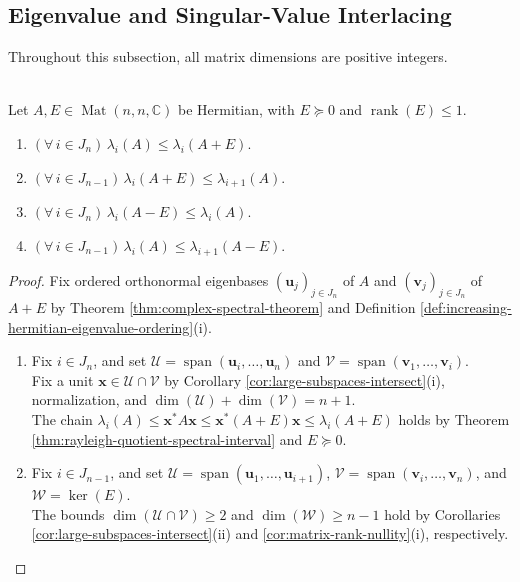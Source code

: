 \subsection{Eigenvalue and Singular-Value Interlacing}

Throughout this subsection, all matrix dimensions are positive integers.

\begin{theorem} \label{thm:rank-one-psd-eigenvalue-interlacing} \\
Let $A,E\in\operatorname{Mat}(n,n,\mathbb{C})$ be Hermitian, with $E\succeq0$ and $\operatorname{rank}(E)\leq1$.
\begin{enumerate}[label=(\roman*)]
\setlength{\itemsep}{0pt}
\item $(\forall\,i\in J_n)\,\lambda_i(A)\leq\lambda_i(A+E)$.
\item $(\forall\,i\in J_{n-1})\,\lambda_i(A+E)\leq\lambda_{i+1}(A)$.
\item $(\forall\,i\in J_n)\,\lambda_i(A-E)\leq\lambda_i(A)$.
\item $(\forall\,i\in J_{n-1})\,\lambda_i(A)\leq\lambda_{i+1}(A-E)$.
\end{enumerate}
\begin{proof}
Fix ordered orthonormal eigenbases $(\mathbf{u}_j)_{j\in J_n}$ of $A$ and $(\mathbf{v}_j)_{j\in J_n}$ of $A+E$ by Theorem \ref{thm:complex-spectral-theorem} and Definition \ref{def:increasing-hermitian-eigenvalue-ordering}(i).
\begin{enumerate}[label=(\roman*)]
\setlength{\itemsep}{0pt}
\item Fix $i\in J_n$, and set $\mathcal{U}=\operatorname{span}(\mathbf{u}_i,\ldots,\mathbf{u}_n)$ and $\mathcal{V}=\operatorname{span}(\mathbf{v}_1,\ldots,\mathbf{v}_i)$.\\
Fix a unit $\mathbf{x}\in\mathcal{U}\cap\mathcal{V}$ by Corollary \ref{cor:large-subspaces-intersect}(i), normalization, and $\dim(\mathcal{U})+\dim(\mathcal{V})=n+1$.\\
The chain $\lambda_i(A)\leq\mathbf{x}^*A\mathbf{x}\leq\mathbf{x}^*(A+E)\mathbf{x}\leq\lambda_i(A+E)$ holds by Theorem \ref{thm:rayleigh-quotient-spectral-interval} and $E\succeq0$.
\item Fix $i\in J_{n-1}$, and set $\mathcal{U}=\operatorname{span}(\mathbf{u}_1,\ldots,\mathbf{u}_{i+1})$, $\mathcal{V}=\operatorname{span}(\mathbf{v}_i,\ldots,\mathbf{v}_n)$, and $\mathcal{W}=\ker(E)$.\\
The bounds $\dim(\mathcal{U}\cap\mathcal{V})\geq2$ and $\dim(\mathcal{W})\geq n-1$ hold by Corollaries \ref{cor:large-subspaces-intersect}(ii) and \ref{cor:matrix-rank-nullity}(i), respectively.\\

\end{enumerate}
\end{proof}
\end{theorem}
